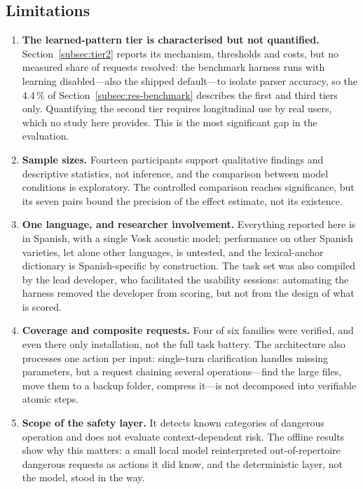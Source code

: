 \documentclass[10pt,a4paper]{article}
\begin{document}
\subsection{Limitations}
\label{subsec:limitations}

\begin{enumerate}[noitemsep,topsep=2pt,leftmargin=*]
    \item \textbf{The learned-pattern tier is characterised but not quantified.} Section~\ref{subsec:tier2} reports its mechanism, thresholds and costs, but no measured share of requests resolved: the benchmark harness runs with learning disabled---also the shipped default---to isolate parser accuracy, so the 4.4\,\% of Section~\ref{subsec:res-benchmark} describes the first and third tiers only. Quantifying the second tier requires longitudinal use by real users, which no study here provides. This is the most significant gap in the evaluation.
    \item \textbf{Sample sizes.} Fourteen participants support qualitative findings and descriptive statistics, not inference, and the comparison between model conditions is exploratory. The controlled comparison reaches significance, but its seven pairs bound the precision of the effect estimate, not its existence.
    \item \textbf{One language, and researcher involvement.} Everything reported here is in Spanish, with a single Vosk acoustic model; performance on other Spanish varieties, let alone other languages, is untested, and the lexical-anchor dictionary is Spanish-specific by construction. The task set was also compiled by the lead developer, who facilitated the usability sessions: automating the harness removed the developer from scoring, but not from the design of what is scored.
    \item \textbf{Coverage and composite requests.} Four of six families were verified, and even there only installation, not the full task battery. The architecture also processes one action per input: single-turn clarification handles missing parameters, but a request chaining several operations---find the large files, move them to a backup folder, compress it---is not decomposed into verifiable atomic steps.
    \item \textbf{Scope of the safety layer.} It detects known categories of dangerous operation and does not evaluate context-dependent risk. The offline results show why this matters: a small local model reinterpreted out-of-repertoire dangerous requests as actions it did know, and the deterministic layer, not the model, stood in the way.
\end{enumerate}
\end{document}
